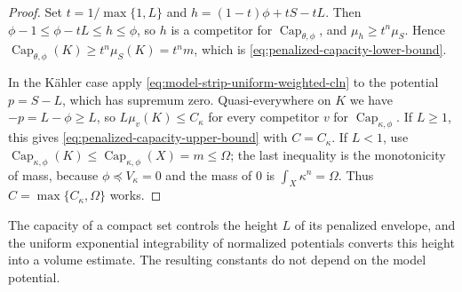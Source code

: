 \begin{proof}
Set $t=1/\max\{1,L\}$ and $h=(1-t)\phi+tS-tL$. Then $\phi-1\leq\phi-tL\leq h\leq\phi$, so $h$ is a competitor for $\operatorname{Cap}_{\theta,\phi}$, and $\mu_h\geq t^n\mu_S$. Hence $\operatorname{Cap}_{\theta,\phi}(K)\geq t^n\mu_S(K)=t^nm$, which is \eqref{eq:penalized-capacity-lower-bound}.

In the K\"ahler case apply \eqref{eq:model-strip-uniform-weighted-cln} to the potential $p=S-L$, which has supremum zero. Quasi-everywhere on $K$ we have $-p=L-\phi\geq L$, so $L\mu_v(K)\leq C_\kappa$ for every competitor $v$ for $\operatorname{Cap}_{\kappa,\phi}$. If $L\geq1$, this gives \eqref{eq:penalized-capacity-upper-bound} with $C=C_\kappa$. If $L<1$, use $\operatorname{Cap}_{\kappa,\phi}(K)\leq\operatorname{Cap}_{\kappa,\phi}(X)=m\leq\Omega$; the last inequality is the monotonicity of mass, because $\phi\preceq V_\kappa=0$ and the mass of $0$ is $\int_X\kappa^n=\Omega$. Thus $C=\max\{C_\kappa,\Omega\}$ works.
\end{proof}

The capacity of a compact set controls the height $L$ of its penalized envelope, and the uniform exponential integrability of normalized potentials converts this height into a volume estimate. The resulting constants do not depend on the model potential.

